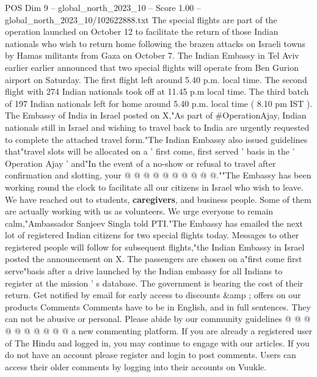 \begin{textsample}{POS Dim 9 – global\_north\_2023\_10 – Score 1.00 – global\_north\_2023\_10/102622888.txt}  \label{ex:f9_pos_303}
The special flights are part of the operation launched on October 12 to facilitate the return of those Indian nationals who wish to return home following the brazen attacks on Israeli towns by Hamas militants from Gaza on October 7.
The Indian Embassy in Tel Aviv earlier earlier announced that two special flights will operate from Ben Gurion airport on Saturday.
The first flight left around 5.40 p.m. local time.
The second flight with 274 Indian nationals took off at 11.45 p.m local time.
The third batch of 197 Indian nationals left for home around 5.40 p.m. local time ( 8.10 pm IST ).
The Embassy of India in Israel posted on X,"As part of \#OperationAjay, Indian nationals still in Israel and wishing to travel back to India are urgently requested to complete the attached travel form."The Indian Embassy also issued guidelines that"travel slots will be allocated on a ' first come, first served ' basis in the ' Operation Ajay ' and"In the event of a no-show or refusal to travel after confirmation and slotting, your @ @ @ @ @ @ @ @ @ @.""The Embassy has been working round the clock to facilitate all our citizens in Israel who wish to leave.
We have reached out to students, \textbf{caregivers}, and business people.
Some of them are actually working with us as volunteers.
We urge everyone to remain calm,"Ambassador Sanjeev Singla told PTI."The Embassy has emailed the next lot of registered Indian citizens for two special flights today.
Messages to other registered people will follow for subsequent flights,"the Indian Embassy in Israel posted the announcement on X.
The passengers are chosen on a"first come first serve"basis after a drive launched by the Indian embassy for all Indians to register at the mission ' s database.
The government is bearing the cost of their return.
Get notified by email for early access to discounts \&amp ; offers on our products Comments Comments have to be in English, and in full sentences.
They can not be abusive or personal.
Please abide by our community guidelines @ @ @ @ @ @ @ @ @ @ a new commenting platform.
If you are already a registered user of The Hindu and logged in, you may continue to engage with our articles.
If you do not have an account please register and login to post comments.
Users can access their older comments by logging into their accounts on Vuukle.

\end{textsample}
